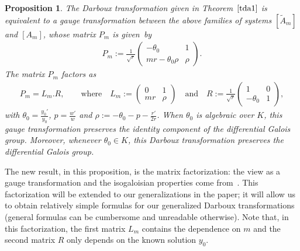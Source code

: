 \documentclass[10pt,a4paper]{amsart}
\numberwithin{equation}{section}
\newtheorem{Proposition}[Theorem]{Proposition}
 { \theoremstyle{definition}
\newtheorem{Definition}[Theorem]{Definition}
\newtheorem{Note}[Theorem]{Note}
\newtheorem{Example}[Theorem]{Example}
\newtheorem{Remark}[Theorem]{Remark} }
\begin{document}
\begin{Proposition} \label{prop1}
The Darboux transformation given in Theorem~$\ref{tda1}$ is
equivalent to a
gauge transformation between the above families of systems $[\tilde{A}_m]$ and $[A_m]$,
whose matrix $P_m$ is given~by
\begin{gather}\label{gauge}
P_m:=\frac{1}{\sqrt{r}} \begin{pmatrix}
- \theta_0&1 \\ mr - \theta_0 \rho &\rho
\end{pmatrix}\!.
\end{gather}
The matrix $P_m$ factors as
\begin{gather*}
P_m= L_m . R, \qquad\textrm{where} \quad
L_m:= \begin{pmatrix}
0 & 1 \\ m r & \rho
\end{pmatrix}
\quad\textrm{and}\quad
R:=\frac{1}{\sqrt{r}}\begin{pmatrix}
1 & 0 \\ -\theta_0 & 1
\end{pmatrix}\!,
\end{gather*}
with $\theta_0=\frac{y_0'}{y_0}$, $p=\frac{w'}{w}$ and $\rho:=-\theta_0-p-\frac{r'}{2r}$.
When $\theta_0$ is algebraic over $K$, this gauge transformation preserves the identity component of the differential Galois group. 	
Moreover, whenever
$\theta_0 \in K$, this Darboux transformation
preserves the differential Galois group. 	
\end{Proposition}

\begin{Remark}
The new result, in this proposition, is the matrix factorization: the view as a gauge transformation and the isogaloisian properties come from~\cite{AP1}.
This factorization will be extended to our generalizations in the paper; it will allow us to obtain relatively simple formulas for our generalized Darboux transformations (general formulas can be cumbersome and unreadable otherwise).
Note that, in this factorization, the first matrix $L_m$ contains the dependence on $m$ and the second matrix $R$ only depends on the known solution $y_0$.
\end{Remark}
\end{document}
